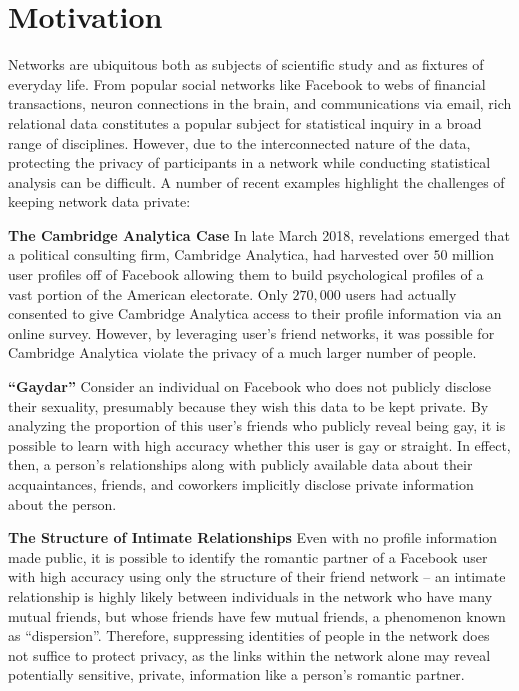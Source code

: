 \section{Motivation}

Networks are ubiquitous both as subjects of scientific study and as fixtures of everyday life. From popular social networks like Facebook to webs of financial transactions, neuron connections in the brain, and communications via email, rich relational data constitutes a popular subject for statistical inquiry in a broad range of disciplines. However, due to the interconnected nature of the data, protecting the privacy of participants in a network while conducting statistical analysis can be difficult. A number of recent examples highlight the challenges of keeping network data private:

\textbf{The Cambridge Analytica Case}
In late March 2018, revelations emerged that a political consulting firm, Cambridge Analytica, had harvested over $50$ million user profiles off of Facebook allowing them to build psychological profiles of a vast portion of the American electorate. Only $270,000$ users had actually consented to give Cambridge Analytica access to their profile information via an online survey. However, by leveraging user's friend networks, it was possible for Cambridge Analytica violate the privacy of a much larger number of people. 
\cite{nytimes}

\textbf{``Gaydar''}
Consider an individual on Facebook who does not publicly disclose their sexuality, presumably because they wish this data to be kept private. By analyzing the proportion of this user's friends who publicly reveal being gay, it is possible to learn with high accuracy whether this user is gay or straight. In effect, then, a person's relationships along with publicly available data about their acquaintances, friends, and coworkers implicitly disclose private information about the person. \cite{JM09}

\textbf{The Structure of Intimate Relationships}
Even with no profile information made public, it is possible to identify the romantic partner of a Facebook user with high accuracy using only the structure of their friend network -- an intimate relationship is highly likely between individuals in the network who have many mutual friends, but whose friends have few mutual friends, a phenomenon known as ``dispersion''. Therefore, suppressing identities of people in the network does not suffice to protect privacy, as the links within the network alone may reveal potentially sensitive, private, information like a person's romantic partner.  \cite{BK14}

